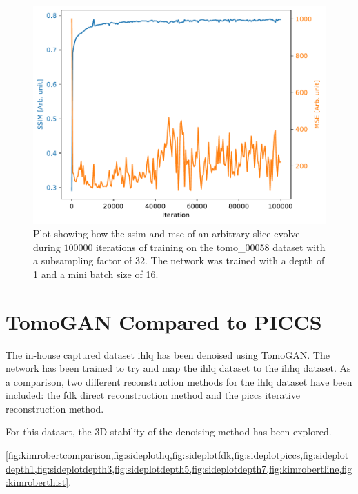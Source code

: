 \begin{figure}[htbp]
  \centering
  \includegraphics[width=.85\textwidth]{figures/ssimns32logcosh.pdf}
  \caption[SSIM and MSE evolution during training]{Plot showing how the \gls{ssim} and \gls{mse} of an arbitrary slice evolve during $100000$ iterations of training on the tomo\_00058 dataset with a subsampling factor of 32. The network was trained with a depth of 1 and a mini batch size of 16. }
  \label{fig:ssimmseevolution}
\end{figure}


\section{TomoGAN Compared to PICCS}
The in-house captured dataset \gls{ihlq} has been denoised using TomoGAN. The network has been trained to try and map the \gls{ihlq} dataset to the \gls{ihhq} dataset. As a comparison, two different reconstruction methods for the \gls{ihlq} dataset have been included: the \gls{fdk} direct reconstruction method and the \gls{piccs} iterative reconstruction method. 

For this dataset, the 3D stability of the denoising method has been explored. 


\cref{fig:kimrobertcomparison,fig:sideplothq,fig:sideplotfdk,fig:sideplotpiccs,fig:sideplotdepth1,fig:sideplotdepth3,fig:sideplotdepth5,fig:sideplotdepth7,fig:kimrobertline,fig:kimroberthist}. 

